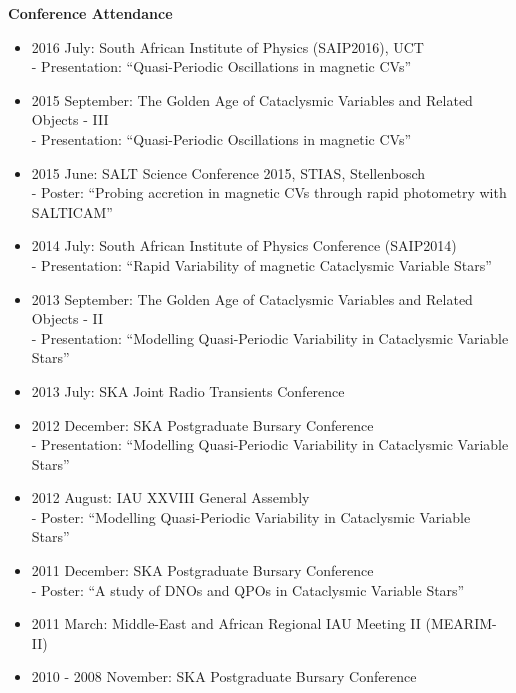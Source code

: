 \documentclass{article}
\begin{document}
\large\textbf{Conference Attendance}
\vspace{0.2cm}
\normalsize
\begin{itemize}
 \item 2016 July: South African Institute of Physics (SAIP2016), UCT\\
 \hspace*{0.4cm} - Presentation: ``Quasi-Periodic Oscillations in magnetic CVs''
 \item 2015 September: The Golden Age of Cataclysmic Variables and Related Objects - III\\
 \hspace*{0.4cm} - Presentation: ``Quasi-Periodic Oscillations in magnetic CVs''
 \item 2015 June: SALT Science Conference 2015, STIAS, Stellenbosch \\
 \hspace*{0.4cm} - Poster: ``Probing accretion in magnetic CVs through rapid photometry with SALTICAM''
 \item 2014 July: South African Institute of Physics Conference (SAIP2014)\\
 \hspace*{0.4cm} - Presentation: ``Rapid Variability of magnetic Cataclysmic Variable Stars''
 \item 2013 September: The Golden Age of Cataclysmic Variables and Related Objects - II\\
 \hspace*{0.4cm} - Presentation: ``Modelling Quasi-Periodic Variability in Cataclysmic Variable Stars''
 \item 2013 July: SKA Joint Radio Transients Conference\\
 \hspace*{0.4cm}
 \item 2012 December: SKA Postgraduate Bursary Conference\\
 \hspace*{0.4cm} - Presentation: ``Modelling Quasi-Periodic Variability in Cataclysmic Variable Stars''
 \item 2012 August: IAU XXVIII General Assembly\\
 \hspace*{0.4cm} - Poster: ``Modelling Quasi-Periodic Variability in Cataclysmic Variable Stars''
 \item 2011 December: SKA Postgraduate Bursary Conference\\
 \hspace*{0.4cm} - Poster: ``A study of DNOs and QPOs in Cataclysmic Variable Stars''
 \item 2011 March: Middle-East and African Regional IAU Meeting II (MEARIM-II)
 \item 2010 - 2008 November: SKA Postgraduate Bursary Conference
\end{itemize}
\end{document}
